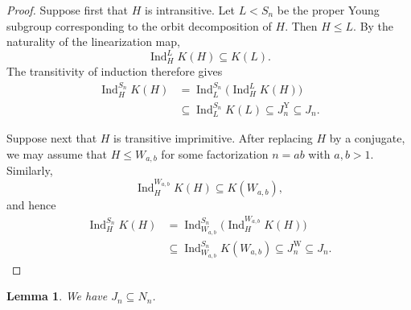 \documentclass[a4paper,11pt]{article}
\numberwithin{equation}{section}
\newtheorem{lemma}[theorem]{Lemma}
\newcommand{\Ind}{\operatorname{Ind}}
\begin{document}
\begin{proof}
Suppose first that $H$ is intransitive. Let $L<S_n$ be the proper Young
subgroup corresponding to the orbit decomposition of $H$. Then $H\le L$.
By the naturality of the linearization map,
\[
  \Ind_H^L K(H)\subseteq K(L).
\]
The transitivity of induction therefore gives
\[
\begin{aligned}
  \Ind_H^{S_n}K(H)
  &=
  \Ind_L^{S_n}\bigl(\Ind_H^L K(H)\bigr)\\
  &\subseteq
  \Ind_L^{S_n}K(L)
  \subseteq
  J_n^{\mathrm Y}
  \subseteq
  J_n.
\end{aligned}
\]

Suppose next that $H$ is transitive imprimitive. After replacing $H$ by a
conjugate, we may assume that $H\le W_{a,b}$ for some factorization $n=ab$ with
$a,b>1$. Similarly,
\[
  \Ind_H^{W_{a,b}}K(H)\subseteq K(W_{a,b}),
\]
and hence
\[
\begin{aligned}
  \Ind_H^{S_n}K(H)
  &=
  \Ind_{W_{a,b}}^{S_n}
  \bigl(\Ind_H^{W_{a,b}}K(H)\bigr)\\
  &\subseteq
  \Ind_{W_{a,b}}^{S_n}K(W_{a,b})
  \subseteq
  J_n^{\mathrm W}
  \subseteq
  J_n.
\end{aligned}
\]
\end{proof}

\begin{lemma}\label{lem:J-in-N}
We have $J_n\subseteq N_n$.
\end{lemma}
\end{document}
